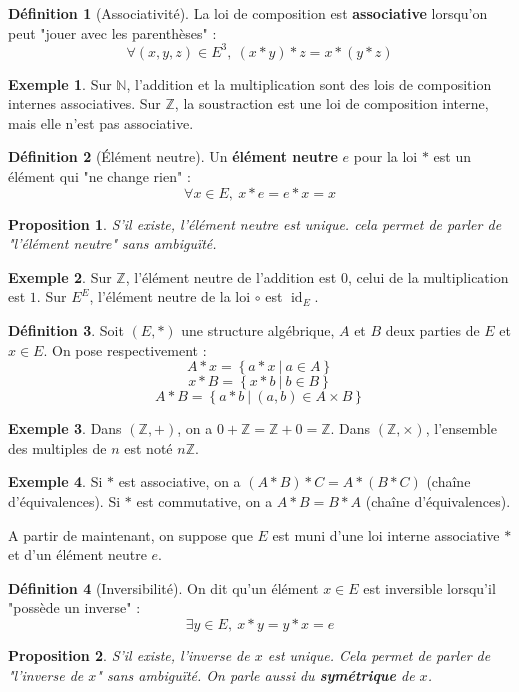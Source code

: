 \documentclass[french]{book}
\newcommand{\N}{\mathbb{N}}
\newcommand{\Z}{\mathbb{Z}}
\theoremstyle{plain}
\newtheorem{prop}{Proposition}[chapter]
\theoremstyle{definition}
\newtheorem{dfn}{Définition}[chapter]
\newtheorem{exa}{Exemple}[chapter]
\theoremstyle{remark}
\DeclareMathOperator{\id}{id}
\begin{document}
\begin{dfn}[Associativité]
	La loi de composition est \textbf{associative} lorsqu'on peut "jouer avec les parenthèses" : $$\forall(x,y,z)\in E^3,\ (x*y)*z=x*(y*z)$$
\end{dfn}
\begin{exa}
	Sur $\N$, l'addition et la multiplication sont des lois de composition internes associatives. Sur $\Z$, la soustraction est une loi de composition interne, mais elle n'est pas associative.
\end{exa}
\begin{dfn}[Élément neutre]
	Un \textbf{élément neutre} $e$ pour la loi $*$ est un élément qui "ne change rien" : $$\forall x\in E,\ x*e=e*x=x$$
\end{dfn}
\begin{prop}
	S'il existe, l'élément neutre est unique. cela permet de parler de "l'élément neutre" sans ambiguïté.
\end{prop}
\begin{exa}
	Sur $\Z$, l'élément neutre de l'addition est $0$, celui de la multiplication est $1$. Sur $E^E$, l'élément neutre de la loi $\circ$ est $\id_E$.
\end{exa}
\begin{dfn}
	Soit $(E,*)$ une structure algébrique, $A$ et $B$ deux parties de $E$ et $x\in E$. On pose respectivement : $$A*x=\left\{a*x \ | \ a\in A\right\}$$ $$x*B=\left\{x*b\ | \ b\in B\right\}$$ $$A*B=\left\{a*b\ | \ (a,b)\in A\times B\right\}$$
\end{dfn}
\begin{exa}
	Dans $(\Z,+)$, on a $0+\Z=\Z+0=\Z$. Dans $(\Z,\times)$, l'ensemble des multiples de $n$ est noté $n\Z$.
\end{exa}
\begin{exa}
	Si $*$ est associative, on a $(A*B)*C=A*(B*C)$ (chaîne d'équivalences). Si $*$ est commutative, on a $A*B=B*A$ (chaîne d'équivalences).
\end{exa}
A partir de maintenant, on suppose que $E$ est muni d'une loi interne associative $*$ et d'un élément neutre $e$.
\begin{dfn}[Inversibilité]
	On dit qu'un élément $x\in E$ est inversible lorsqu'il "possède un inverse" : $$\exists y\in E,\ x*y=y*x=e$$
\end{dfn}
\begin{prop}
	S'il existe, l'inverse de $x$ est unique. Cela permet de parler de "l'inverse de $x$" sans ambiguïté. On parle aussi du \textbf{symétrique} de $x$.
\end{prop}
\end{document}
